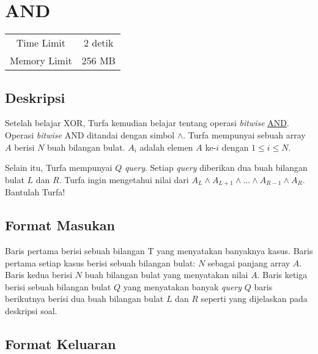 \documentclass{article}
\begin{document}
\section*{\hfil AND\hfil}

\begin{center}
\begin{tabular}{ |cc| } 
 \hline
 Time Limit & 2 detik \\ 
 Memory Limit & 256 MB \\
 \hline
\end{tabular}
\end{center}

\subsection*{Deskripsi}
\par Setelah belajar XOR, Turfa kemudian belajar tentang operasi \textit{bitwise} \href{https://en.wikipedia.org/wiki/Bitwise_operation#AND}{AND}. Operasi \textit{bitwise} AND ditandai dengan simbol $\land$. Turfa mempunyai sebuah array $A$ berisi $N$ buah bilangan bulat. $A_{i}$ adalah elemen $A$ ke-$i$ dengan $1 \leq i \leq N$.
\par Selain itu, Turfa mempunyai $Q$ \textit{query}. Setiap \textit{query} diberikan dua buah bilangan bulat $L$ dan $R$. Turfa ingin mengetahui nilai dari $A_{L} \land A_{L+1} \land ... \land A_{R-1} \land A_{R}$. Bantulah Turfa!

\subsection*{Format Masukan}
\par Baris pertama berisi sebuah bilangan T yang menyatakan banyaknya kasus.
\newline Baris pertama setiap kasus berisi sebuah bilangan bulat: $N$ sebagai panjang array $A$.
\newline Baris kedua berisi $N$ buah bilangan bulat yang menyatakan nilai $A$.
\newline Baris ketiga berisi sebuah bilangan bulat $Q$ yang menyatakan banyak \textit{query}
\newline $Q$ baris berikutnya berisi dua buah bilangan bulat $L$ dan $R$ seperti yang dijelaskan pada deskripsi soal.

\subsection*{Format Keluaran}
\end{document}
